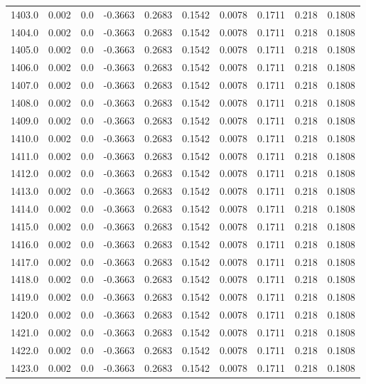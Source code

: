 \begin{longtable}{lrrrrrrrrr}
1403.0 & 0.002 & 0.0 & -0.3663 & 0.2683 & 0.1542 & 0.0078 & 0.1711 & 0.218 & 0.1808 \\
1404.0 & 0.002 & 0.0 & -0.3663 & 0.2683 & 0.1542 & 0.0078 & 0.1711 & 0.218 & 0.1808 \\
1405.0 & 0.002 & 0.0 & -0.3663 & 0.2683 & 0.1542 & 0.0078 & 0.1711 & 0.218 & 0.1808 \\
1406.0 & 0.002 & 0.0 & -0.3663 & 0.2683 & 0.1542 & 0.0078 & 0.1711 & 0.218 & 0.1808 \\
1407.0 & 0.002 & 0.0 & -0.3663 & 0.2683 & 0.1542 & 0.0078 & 0.1711 & 0.218 & 0.1808 \\
1408.0 & 0.002 & 0.0 & -0.3663 & 0.2683 & 0.1542 & 0.0078 & 0.1711 & 0.218 & 0.1808 \\
1409.0 & 0.002 & 0.0 & -0.3663 & 0.2683 & 0.1542 & 0.0078 & 0.1711 & 0.218 & 0.1808 \\
1410.0 & 0.002 & 0.0 & -0.3663 & 0.2683 & 0.1542 & 0.0078 & 0.1711 & 0.218 & 0.1808 \\
1411.0 & 0.002 & 0.0 & -0.3663 & 0.2683 & 0.1542 & 0.0078 & 0.1711 & 0.218 & 0.1808 \\
1412.0 & 0.002 & 0.0 & -0.3663 & 0.2683 & 0.1542 & 0.0078 & 0.1711 & 0.218 & 0.1808 \\
1413.0 & 0.002 & 0.0 & -0.3663 & 0.2683 & 0.1542 & 0.0078 & 0.1711 & 0.218 & 0.1808 \\
1414.0 & 0.002 & 0.0 & -0.3663 & 0.2683 & 0.1542 & 0.0078 & 0.1711 & 0.218 & 0.1808 \\
1415.0 & 0.002 & 0.0 & -0.3663 & 0.2683 & 0.1542 & 0.0078 & 0.1711 & 0.218 & 0.1808 \\
1416.0 & 0.002 & 0.0 & -0.3663 & 0.2683 & 0.1542 & 0.0078 & 0.1711 & 0.218 & 0.1808 \\
1417.0 & 0.002 & 0.0 & -0.3663 & 0.2683 & 0.1542 & 0.0078 & 0.1711 & 0.218 & 0.1808 \\
1418.0 & 0.002 & 0.0 & -0.3663 & 0.2683 & 0.1542 & 0.0078 & 0.1711 & 0.218 & 0.1808 \\
1419.0 & 0.002 & 0.0 & -0.3663 & 0.2683 & 0.1542 & 0.0078 & 0.1711 & 0.218 & 0.1808 \\
1420.0 & 0.002 & 0.0 & -0.3663 & 0.2683 & 0.1542 & 0.0078 & 0.1711 & 0.218 & 0.1808 \\
1421.0 & 0.002 & 0.0 & -0.3663 & 0.2683 & 0.1542 & 0.0078 & 0.1711 & 0.218 & 0.1808 \\
1422.0 & 0.002 & 0.0 & -0.3663 & 0.2683 & 0.1542 & 0.0078 & 0.1711 & 0.218 & 0.1808 \\
1423.0 & 0.002 & 0.0 & -0.3663 & 0.2683 & 0.1542 & 0.0078 & 0.1711 & 0.218 & 0.1808 \\

\end{longtable}
